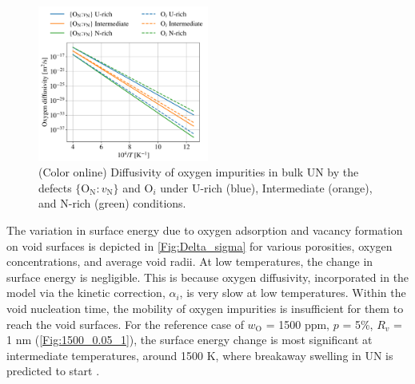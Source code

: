 \documentclass[preprint,12pt,sort&compress]{elsarticle}
\newcommand{\?}{\stackrel{?}{=}}
\begin{document}
\begin{figure}[h!]
    \centering
    \includegraphics[width=0.5\textwidth]{DO.png}
    \caption{(Color online) Diffusivity of oxygen impurities in bulk UN by the defects $ \{\text{O}_\text{N} \! : \! v_\text{N}\} $ and $ \text{O}_i $ under U-rich (blue), Intermediate (orange), and N-rich (green) conditions.}
    \label{Fig:DO}
\end{figure}

The variation in surface energy due to oxygen adsorption and vacancy formation on void surfaces is depicted in \cref{Fig:Delta_sigma} for various porosities, oxygen concentrations, and average void radii. At low temperatures, the change in surface energy is negligible. This is because oxygen diffusivity, incorporated in the model via the kinetic correction, $\alpha_i$, is very slow at low temperatures. Within the void nucleation time, the mobility of oxygen impurities is insufficient for them to reach the void surfaces. For the reference case of $w_\text{O}$ = 1500 ppm, $p$ = 5\%, $R_v$ = 1 nm (\cref{Fig:1500_0.05_1}), the surface energy change is most significant at intermediate temperatures, around 1500 K, where breakaway swelling in UN is predicted to start \cite{Rizk2025}.
\end{document}
